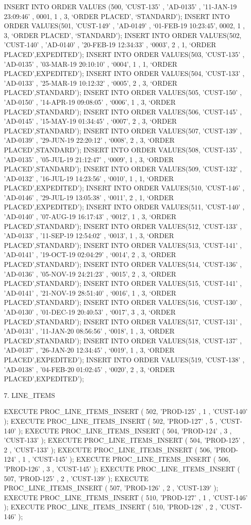 INSERT INTO ORDER VALUES (500, 'CUST-135' , 'AD-0135' , '11-JAN-19 23:09:46’ , 0001, 1 , 3, ‘ORDER PLACED', ‘STANDARD’);
INSERT INTO ORDER VALUES(501, 'CUST-149' , 'AD-0149' , ‘01-FEB-19 10:23:45’, 0002, 1 , 3, ‘ORDER PLACED', ‘STANDARD’);
INSERT INTO ORDER VALUES(502, 'CUST-140' , 'AD-0140' , '20-FEB-19 12:34:33' , ‘0003’, 2 , 1, ‘ORDER PLACED',EXPEDITED’);
INSERT INTO ORDER VALUES(503, 'CUST-135' , 'AD-0135' , '03-MAR-19 20:10:10' , ‘0004’, 1 , 1, ‘ORDER PLACED',EXPEDITED’);
INSERT INTO ORDER VALUES(504, 'CUST-133' , 'AD-0133' , '25-MAR-19 10:12:32' , ‘0005’, 2 , 3, ‘ORDER PLACED',STANDARD’);
INSERT INTO ORDER VALUES(505, 'CUST-150' , 'AD-0150' , '14-APR-19 09:08:05' , ‘0006’, 1 , 3, ‘ORDER PLACED',STANDARD’);
INSERT INTO ORDER VALUES(506, 'CUST-145' , 'AD-0145' , '15-MAY-19 01:34:45' , ‘0007’, 2 , 3, ‘ORDER PLACED',STANDARD’);
INSERT INTO ORDER VALUES(507, 'CUST-139' , 'AD-0139' , '29-JUN-19 22:20:12' , ‘0008’, 2 , 3, ‘ORDER PLACED',STANDARD’);
INSERT INTO ORDER VALUES(508, 'CUST-135' , 'AD-0135' , '05-JUL-19 21:12:47' , ‘0009’, 1 , 3, ‘ORDER PLACED',STANDARD’);
INSERT INTO ORDER VALUES(509, 'CUST-132' , 'AD-0132' , '16-JUL-19 14:23:56' , ‘0010’, 1 , 1, ‘ORDER PLACED',EXPEDITED’);
INSERT INTO ORDER VALUES(510, 'CUST-146' , 'AD-0146' , '29-JUL-19 13:05:38' , ‘0011’, 2 , 1, ‘ORDER PLACED',EXPEDITED’);
INSERT INTO ORDER VALUES(511, 'CUST-140' , 'AD-0140' , '07-AUG-19 16:17:43' , ‘0012’, 1 , 3, ‘ORDER PLACED',STANDARD’);
INSERT INTO ORDER VALUES(512, 'CUST-133' , 'AD-0133' , '11-SEP-19 12:54:02' , ‘0013’, 1 , 3, ‘ORDER PLACED',STANDARD’);
INSERT INTO ORDER VALUES(513, 'CUST-141' , 'AD-0141' , '19-OCT-19 02:04:29' , ‘0014’, 2 , 3, ‘ORDER PLACED',STANDARD’);
INSERT INTO ORDER VALUES(514, 'CUST-136' , 'AD-0136' , '05-NOV-19 24:21:23' , ‘0015’, 2 , 3, ‘ORDER PLACED',STANDARD’);
INSERT INTO ORDER VALUES(515, 'CUST-141' , 'AD-0141' , '21-NOV-19 28:51:40' , ‘0016’, 1 , 3, ‘ORDER PLACED',STANDARD’);
INSERT INTO ORDER VALUES(516, 'CUST-130' , 'AD-0130' , '01-DEC-19 20:40:53' , ‘0017’, 3 , 3, ‘ORDER PLACED',STANDARD’);
INSERT INTO ORDER VALUES(517, 'CUST-131' , 'AD-0131' , '11-JAN-20 08:56:56' , ‘0018’, 1 , 3, ‘ORDER PLACED',STANDARD’);
INSERT INTO ORDER VALUES(518, 'CUST-137' , 'AD-0137’ , '26-JAN-20 12:34:45' , ‘0019’, 1 , 3, ‘ORDER PLACED',EXPEDITED’);
INSERT INTO ORDER VALUES(519, 'CUST-138' , 'AD-0138’ , '04-FEB-20 01:02:45' , ‘0020’, 2 , 3, ‘ORDER PLACED',EXPEDITED’);


7.	LINE_ITEMS


EXECUTE PROC_LINE_ITEMS_INSERT ( 502, 'PROD-125' , 1 , 'CUST-140'  );
EXECUTE PROC_LINE_ITEMS_INSERT ( 502, 'PROD-127' , 5 , 'CUST-140' );
EXECUTE PROC_LINE_ITEMS_INSERT ( 504, 'PROD-124' , 3 , 'CUST-133'  );
EXECUTE PROC_LINE_ITEMS_INSERT ( 504, 'PROD-125' , 2 , 'CUST-133' );
EXECUTE PROC_LINE_ITEMS_INSERT ( 506, 'PROD-124' , 1 , 'CUST-145'  );
EXECUTE PROC_LINE_ITEMS_INSERT ( 506, 'PROD-126' , 3 , 'CUST-145' );
EXECUTE PROC_LINE_ITEMS_INSERT ( 507, 'PROD-125' , 2 , 'CUST-139'  );
EXECUTE PROC_LINE_ITEMS_INSERT ( 507, 'PROD-126' , 2 , 'CUST-139' );
EXECUTE PROC_LINE_ITEMS_INSERT ( 510, 'PROD-127' , 1 , 'CUST-146'  );
EXECUTE PROC_LINE_ITEMS_INSERT ( 510, 'PROD-128' , 2 , 'CUST-146' );






